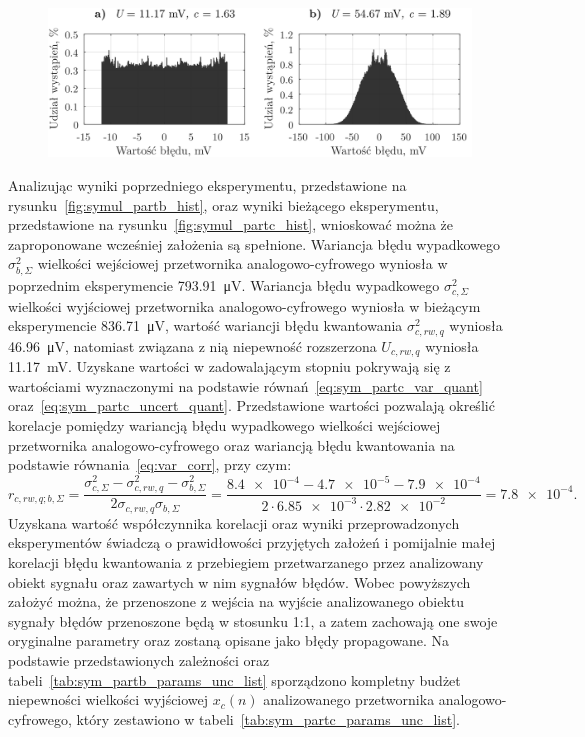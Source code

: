 \begin{figure}[htb!]
\begin{center}
\includegraphics{obrazki/hist_part_c}
\end{center}
\end{figure}

Analizując wyniki poprzedniego eksperymentu, przedstawione na rysunku~\ref{fig:symul_partb_hist}, oraz wyniki bieżącego eksperymentu, przedstawione na rysunku~\ref{fig:symul_partc_hist}, wnioskować można że zaproponowane wcześniej założenia są spełnione. Wariancja błędu wypadkowego $\sigma_{b,\Sigma}^{2}$ wielkości wejściowej przetwornika analogowo-cyfrowego wyniosła w poprzednim eksperymencie \qty{793.91}{\micro V}. Wariancja błędu wypadkowego $\sigma_{c,\Sigma}^{2}$ wielkości wyjściowej przetwornika analogowo-cyfrowego wyniosła w bieżącym eksperymencie \qty{836.71}{\micro V}, wartość wariancji błędu kwantowania $\sigma_{c,rw,q}^{2}$ wyniosła \qty{46.96}{\micro V}, natomiast związana z nią niepewność rozszerzona $U_{c,rw,q}$ wyniosła \qty{11.17}{mV}. Uzyskane wartości w zadowalającym stopniu pokrywają się z wartościami wyznaczonymi na podstawie równań~\eqref{eq:sym_partc_var_quant} oraz~\eqref{eq:sym_partc_uncert_quant}. Przedstawione wartości pozwalają określić korelacje pomiędzy wariancją błędu wypadkowego wielkości wejściowej przetwornika analogowo-cyfrowego oraz wariancją błędu kwantowania na podstawie równania~\eqref{eq:var_corr}, przy czym:
\begin{equation}
r_{c,rw,q;b,\Sigma} = \frac{\sigma_{c,\Sigma}^{2} - \sigma_{c,rw,q}^{2} - \sigma_{b,\Sigma}^{2}}{2 \sigma_{c,rw,q} \sigma_{b,\Sigma}} = \frac{\num{8.4e-4} - \num{4.7e-5} - \num{7.9e-4}}{2 \cdot \num{6.85e-3} \cdot \num{2.82e-2}} = \num{7.8e-4} \label{eq:sym_partc_corr}.
\end{equation}
Uzyskana wartość współczynnika korelacji oraz wyniki przeprowadzonych eksperymentów świadczą o prawidłowości przyjętych założeń i pomijalnie małej korelacji błędu kwantowania z przebiegiem przetwarzanego przez analizowany obiekt sygnału oraz zawartych w nim sygnałów błędów. Wobec powyższych założyć można, że przenoszone z wejścia na wyjście analizowanego obiektu sygnały błędów przenoszone będą w stosunku 1:1, a zatem zachowają one swoje oryginalne parametry oraz zostaną opisane jako błędy propagowane. Na podstawie przedstawionych zależności oraz tabeli~\ref{tab:sym_partb_params_unc_list} sporządzono kompletny budżet niepewności wielkości wyjściowej $x_{c}(n)$ analizowanego przetwornika analogowo-cyfrowego, który zestawiono w tabeli~\ref{tab:sym_partc_params_unc_list}.

